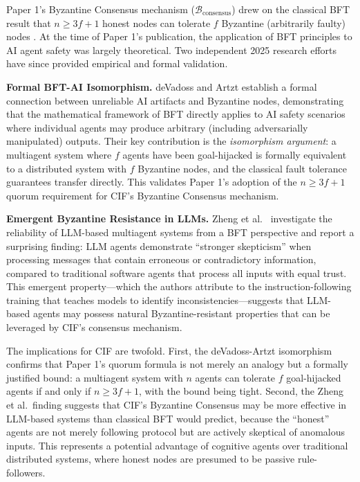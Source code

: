 \documentclass[
]{article}
\begin{document}
Paper 1's Byzantine Consensus mechanism
(\(\mathcal{B}_{\text{consensus}}\)) \cite{friedman2026cogsec1} drew on
the classical BFT result that \(n \geq 3f+1\) honest nodes can tolerate
\(f\) Byzantine (arbitrarily faulty) nodes \cite{lamport1982byzantine}.
At the time of Paper 1's publication, the application of BFT principles
to AI agent safety was largely theoretical. Two independent 2025
research efforts have since provided empirical and formal validation.

\textbf{Formal BFT-AI Isomorphism.} deVadoss and Artzt
\cite{devadoss2025bft} establish a formal connection between unreliable
AI artifacts and Byzantine nodes, demonstrating that the mathematical
framework of BFT directly applies to AI safety scenarios where
individual agents may produce arbitrary (including adversarially
manipulated) outputs. Their key contribution is the \emph{isomorphism
argument}: a multiagent system where \(f\) agents have been
goal-hijacked is formally equivalent to a distributed system with \(f\)
Byzantine nodes, and the classical fault tolerance guarantees transfer
directly. This validates Paper 1's adoption of the \(n \geq 3f+1\)
quorum requirement for CIF's Byzantine Consensus mechanism.

\textbf{Emergent Byzantine Resistance in LLMs.} Zheng et
al.~\cite{zheng2025rethinking} investigate the reliability of LLM-based
multiagent systems from a BFT perspective and report a surprising
finding: LLM agents demonstrate ``stronger skepticism'' when processing
messages that contain erroneous or contradictory information, compared
to traditional software agents that process all inputs with equal trust.
This emergent property---which the authors attribute to the
instruction-following training that teaches models to identify
inconsistencies---suggests that LLM-based agents may possess natural
Byzantine-resistant properties that can be leveraged by CIF's consensus
mechanism.

The implications for CIF are twofold. First, the deVadoss-Artzt
isomorphism confirms that Paper 1's quorum formula is not merely an
analogy but a formally justified bound: a multiagent system with \(n\)
agents can tolerate \(f\) goal-hijacked agents if and only if
\(n \geq 3f+1\), with the bound being tight. Second, the Zheng et
al.~finding suggests that CIF's Byzantine Consensus may be more
effective in LLM-based systems than classical BFT would predict, because
the ``honest'' agents are not merely following protocol but are actively
skeptical of anomalous inputs. This represents a potential advantage of
cognitive agents over traditional distributed systems, where honest
nodes are presumed to be passive rule-followers.
\end{document}

